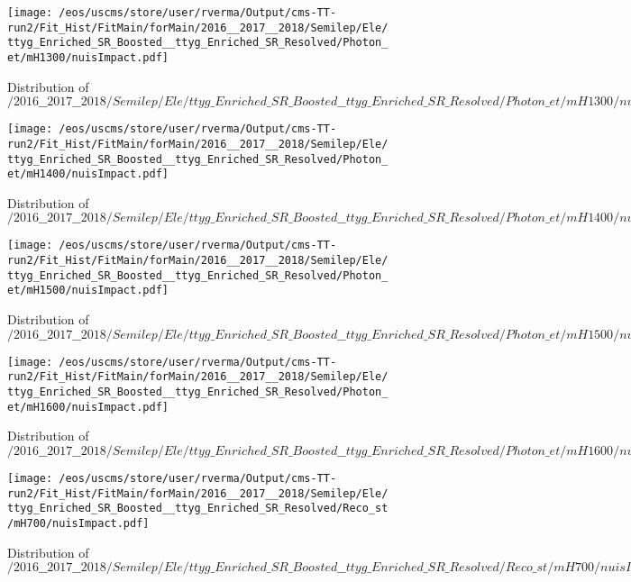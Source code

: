 \begin{figure}
\centering
\texttt{[image: /eos/uscms/store/user/rverma/Output/cms-TT-run2/Fit\_Hist/FitMain/forMain/2016\_\_2017\_\_2018/Semilep/Ele/ttyg\_Enriched\_SR\_Boosted\_\_ttyg\_Enriched\_SR\_Resolved/Photon\_et/mH1300/nuisImpact.pdf]}
\caption{Distribution of $/2016\_\_2017\_\_2018/Semilep/Ele/ttyg\_Enriched\_SR\_Boosted\_\_ttyg\_Enriched\_SR\_Resolved/Photon\_et/mH1300/nuisImpact.pdf$}
\end{figure}

\begin{figure}
\centering
\texttt{[image: /eos/uscms/store/user/rverma/Output/cms-TT-run2/Fit\_Hist/FitMain/forMain/2016\_\_2017\_\_2018/Semilep/Ele/ttyg\_Enriched\_SR\_Boosted\_\_ttyg\_Enriched\_SR\_Resolved/Photon\_et/mH1400/nuisImpact.pdf]}
\caption{Distribution of $/2016\_\_2017\_\_2018/Semilep/Ele/ttyg\_Enriched\_SR\_Boosted\_\_ttyg\_Enriched\_SR\_Resolved/Photon\_et/mH1400/nuisImpact.pdf$}
\end{figure}

\begin{figure}
\centering
\texttt{[image: /eos/uscms/store/user/rverma/Output/cms-TT-run2/Fit\_Hist/FitMain/forMain/2016\_\_2017\_\_2018/Semilep/Ele/ttyg\_Enriched\_SR\_Boosted\_\_ttyg\_Enriched\_SR\_Resolved/Photon\_et/mH1500/nuisImpact.pdf]}
\caption{Distribution of $/2016\_\_2017\_\_2018/Semilep/Ele/ttyg\_Enriched\_SR\_Boosted\_\_ttyg\_Enriched\_SR\_Resolved/Photon\_et/mH1500/nuisImpact.pdf$}
\end{figure}

\begin{figure}
\centering
\texttt{[image: /eos/uscms/store/user/rverma/Output/cms-TT-run2/Fit\_Hist/FitMain/forMain/2016\_\_2017\_\_2018/Semilep/Ele/ttyg\_Enriched\_SR\_Boosted\_\_ttyg\_Enriched\_SR\_Resolved/Photon\_et/mH1600/nuisImpact.pdf]}
\caption{Distribution of $/2016\_\_2017\_\_2018/Semilep/Ele/ttyg\_Enriched\_SR\_Boosted\_\_ttyg\_Enriched\_SR\_Resolved/Photon\_et/mH1600/nuisImpact.pdf$}
\end{figure}

\begin{figure}
\centering
\texttt{[image: /eos/uscms/store/user/rverma/Output/cms-TT-run2/Fit\_Hist/FitMain/forMain/2016\_\_2017\_\_2018/Semilep/Ele/ttyg\_Enriched\_SR\_Boosted\_\_ttyg\_Enriched\_SR\_Resolved/Reco\_st/mH700/nuisImpact.pdf]}
\caption{Distribution of $/2016\_\_2017\_\_2018/Semilep/Ele/ttyg\_Enriched\_SR\_Boosted\_\_ttyg\_Enriched\_SR\_Resolved/Reco\_st/mH700/nuisImpact.pdf$}
\end{figure}


